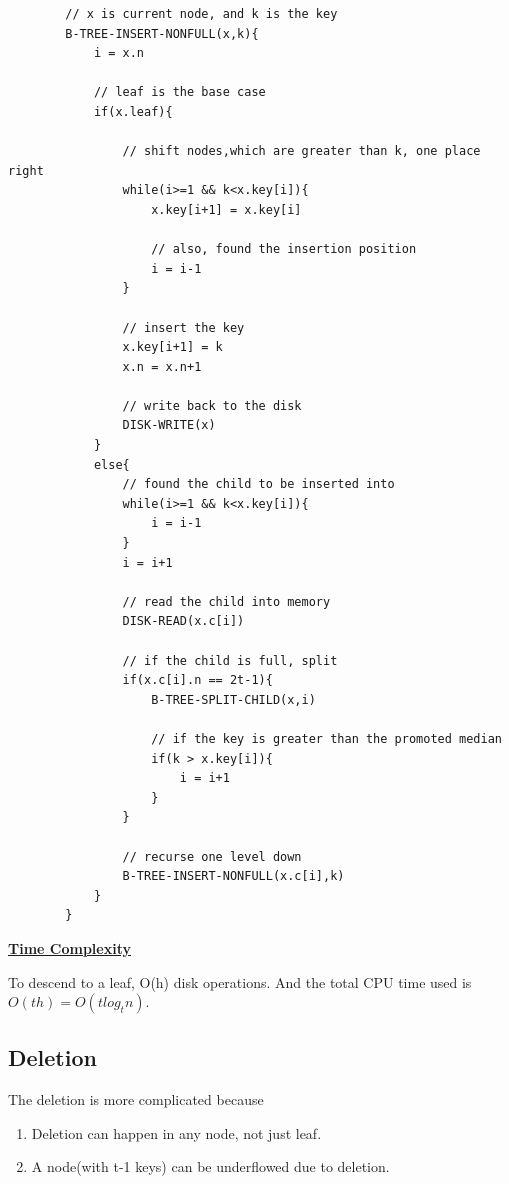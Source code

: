     \begin{lstlisting}
        // x is current node, and k is the key
        B-TREE-INSERT-NONFULL(x,k){
            i = x.n

            // leaf is the base case
            if(x.leaf){

                // shift nodes,which are greater than k, one place right
                while(i>=1 && k<x.key[i]){
                    x.key[i+1] = x.key[i]

                    // also, found the insertion position
                    i = i-1
                }

                // insert the key
                x.key[i+1] = k
                x.n = x.n+1
                
                // write back to the disk
                DISK-WRITE(x)
            }
            else{
                // found the child to be inserted into
                while(i>=1 && k<x.key[i]){
                    i = i-1
                }
                i = i+1

                // read the child into memory
                DISK-READ(x.c[i])

                // if the child is full, split
                if(x.c[i].n == 2t-1){
                    B-TREE-SPLIT-CHILD(x,i)

                    // if the key is greater than the promoted median
                    if(k > x.key[i]){
                        i = i+1
                    }
                }

                // recurse one level down
                B-TREE-INSERT-NONFULL(x.c[i],k)
            }
        }
    \end{lstlisting}


    \underline{\textbf{Time Complexity}}

    To descend to a leaf, O(h) disk operations. And the total CPU time used is
    $O(th) = O(tlog_t n)$.

\subsection{Deletion}

    The deletion is more complicated because
    \begin{enumerate}
        \item Deletion can happen in any node, not just leaf.
        \item A node(with t-1 keys) can be underflowed due to deletion.
    \end{enumerate}


